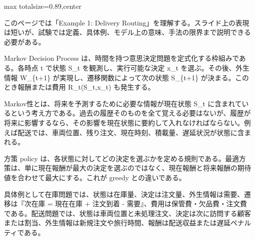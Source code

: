 \begin{minipage}[t]{0.58\textwidth}
\begin{adjustbox}{max totalsize={\textwidth}{0.89\textheight},center}
\begin{minipage}{\textwidth}\scriptsize
{}このページでは「Example 1: Delivery Routing」を理解する。スライド上の表現は短いが、試験では定義、具体例、モデル上の意味、手法の限界まで説明できる必要がある。\par
Markov Decision Process は、時間を持つ意思決定問題を定式化する枠組みである。各時点 t で状態 S\_t を観測し、実行可能な決定 x\_t を選ぶ。その後、外生情報 W\_\{t+1\} が実現し、遷移関数によって次の状態 S\_\{t+1\} が決まる。このとき報酬または費用 R\_t(S\_t,x\_t) も発生する。\par
Markov性とは、将来を予測するために必要な情報が現在状態 S\_t に含まれているという考え方である。過去の履歴そのものを全て覚える必要はないが、履歴が将来に影響するなら、その影響を現在状態に要約して入れなければならない。例えば配送では、車両位置、残り注文、現在時刻、積載量、遅延状況が状態に含まれる。\par
方策 policy は、各状態に対してどの決定を選ぶかを定める規則である。最適方策は、単に現在報酬が最大の決定を選ぶのではなく、現在報酬と将来報酬の期待値を合わせて最大にする。これが greedy との違いである。\par
具体例として在庫問題では、状態は在庫量、決定は注文量、外生情報は需要、遷移は『次在庫 = 現在在庫 + 注文到着 - 需要』、費用は保管費・欠品費・注文費である。配送問題では、状態は車両位置と未処理注文、決定は次に訪問する顧客または割当、外生情報は新規注文や旅行時間、報酬は配送収益または遅延ペナルティである。\par

\end{minipage}
\end{adjustbox}
\end{minipage}
